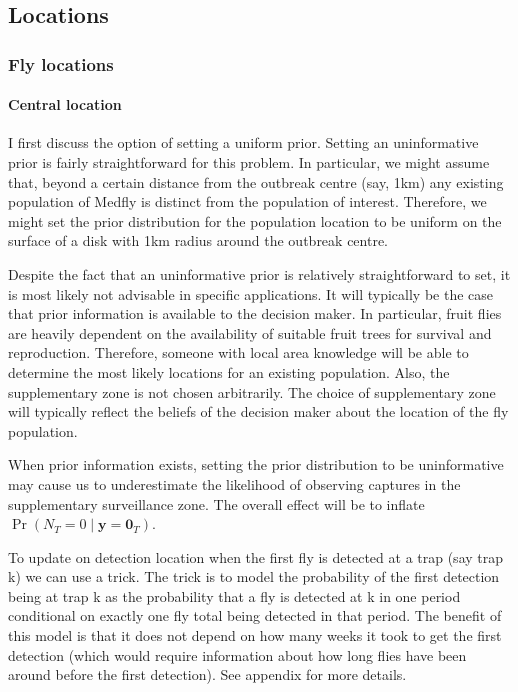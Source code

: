 \documentclass[
]{book}
\begin{document}
\hypertarget{locations}{%
\subsection{Locations}\label{locations}}

\hypertarget{fly-locations}{%
\subsubsection{Fly locations}\label{fly-locations}}

\hypertarget{central-location}{%
\paragraph{Central location}\label{central-location}}

I first discuss the option of setting a uniform prior. Setting an uninformative prior is fairly straightforward for this problem. In particular, we might assume that, beyond a certain distance from the outbreak centre (say, 1km) any existing population of Medfly is distinct from the population of interest. Therefore, we might set the prior distribution for the population location to be uniform on the surface of a disk with 1km radius around the outbreak centre.

Despite the fact that an uninformative prior is relatively straightforward to set, it is most likely not advisable in specific applications. It will typically be the case that prior information is available to the decision maker. In particular, fruit flies are heavily dependent on the availability of suitable fruit trees for survival and reproduction. Therefore, someone with local area knowledge will be able to determine the most likely locations for an existing population. Also, the supplementary zone is not chosen arbitrarily. The choice of supplementary zone will typically reflect the beliefs of the decision maker about the location of the fly population.

When prior information exists, setting the prior distribution to be uninformative may cause us to underestimate the likelihood of observing captures in the supplementary surveillance zone. The overall effect will be to inflate \(\Pr(N_T = 0 \mid \mathbf y = \mathbf 0_T)\).

To update on detection location when the first fly is detected at a trap (say trap k) we can use a trick. The trick is to model the probability of the first detection being at trap k as the probability that a fly is detected at k in one period conditional on exactly one fly total being detected in that period. The benefit of this model is that it does not depend on how many weeks it took to get the first detection (which would require information about how long flies have been around before the first detection). See appendix for more details.
\end{document}
